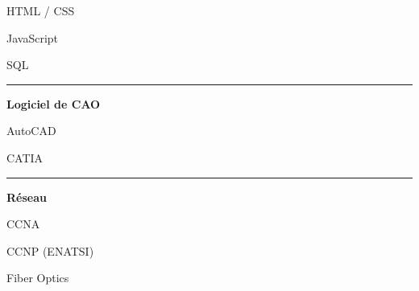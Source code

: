 \documentclass[a4paper]{letter}
\newcommand{\divider}{\rule{\linewidth}{0.9pt}}
\begin{document}
\begin{minipage}[t]{0.40\textwidth}
\faCircleNotch \quad HTML / CSS

\faCircleNotch \quad JavaScript

\faCircleNotch \quad SQL

\divider


{\large \textbf{Logiciel de CAO}}

\faCircleNotch \quad AutoCAD

\faCircleNotch \quad CATIA

\divider



{\large \textbf{Réseau}}

\faNetworkWired \quad CCNA

\faNetworkWired \quad CCNP (ENATSI)

\faNetworkWired \quad Fiber Optics

\end{minipage}
\hfill
\end{document}
